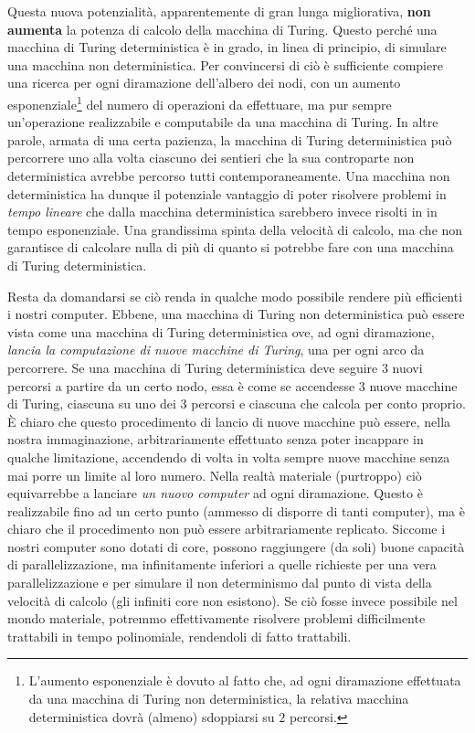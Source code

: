 \documentclass[10pt]{\classname}
\theoremstyle{definition}
\theoremstyle{definition}
\theoremstyle{definition}
\theoremstyle{definition}
\begin{document}
Questa nuova potenzialità, apparentemente di
gran lunga migliorativa, \textbf{non aumenta} la potenza di calcolo della
macchina di Turing. Questo perché una macchina di Turing deterministica è in grado, in linea di principio, di
simulare una macchina non deterministica. Per convincersi di ciò è sufficiente
compiere una ricerca per ogni diramazione dell'albero dei nodi, con un aumento
esponenziale\footnote{L'aumento esponenziale è dovuto al fatto che, ad ogni
diramazione effettuata da una macchina di Turing non deterministica, la
relativa macchina deterministica dovrà (almeno) sdoppiarsi su $2$ percorsi.}
del numero di operazioni da effettuare, ma pur sempre un'operazione
realizzabile e computabile da una macchina di Turing. In altre parole, armata
di una certa pazienza, la macchina di Turing deterministica può percorrere uno
alla volta ciascuno dei sentieri che la sua controparte non deterministica
avrebbe percorso tutti contemporaneamente. Una macchina non deterministica ha
dunque il potenziale vantaggio di poter risolvere problemi in \emph{tempo
lineare} che dalla macchina deterministica sarebbero invece risolti in in tempo
esponenziale. Una grandissima spinta della velocità di calcolo, ma che non
garantisce di calcolare nulla di più di quanto si potrebbe fare con una
macchina di Turing deterministica. 

Resta da domandarsi se ciò renda in qualche
modo possibile rendere più efficienti i nostri computer. Ebbene, una macchina
di Turing non deterministica può essere vista come una macchina di Turing
deterministica ove, ad ogni diramazione, \emph{lancia la computazione di nuove
macchine di Turing}, una per ogni arco da percorrere. Se una macchina di Turing deterministica deve seguire 3
nuovi percorsi a partire da un certo nodo, essa è come se accendesse 3 nuove
macchine di Turing, ciascuna su uno dei 3 percorsi e ciascuna che calcola per conto
proprio. È chiaro che questo procedimento di lancio di nuove macchine può
essere, nella nostra immaginazione, arbitrariamente effettuato senza poter
incappare in qualche limitazione, accendendo di volta in volta sempre nuove macchine senza mai porre un limite al loro numero. Nella realtà materiale (purtroppo) ciò
equivarrebbe a lanciare \emph{un nuovo computer} ad ogni diramazione. Questo è
realizzabile fino ad un certo punto (ammesso di disporre di tanti computer), ma
è chiaro che il procedimento non può essere arbitrariamente replicato. Siccome
i nostri computer sono dotati di core, possono raggiungere (da soli) buone
capacità di parallelizzazione, ma infinitamente inferiori a quelle richieste
per una vera parallelizzazione e per simulare il non determinismo dal punto di
vista della velocità di calcolo (gli infiniti core non esistono). Se ciò fosse
invece possibile nel mondo materiale, potremmo effettivamente risolvere
problemi difficilmente trattabili in tempo polinomiale, rendendoli di fatto
trattabili.
\end{document}
